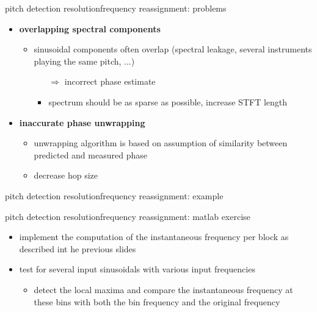         \begin{frame}{pitch detection resolution}{frequency reassignment: problems}
                \begin{itemize}
                    \item   \textbf{overlapping spectral components}
                        \begin{itemize}
                            \item   sinusoidal components often overlap (spectral leakage, several instruments playing the same pitch, ...)
                                \begin{itemize}
                                    \item[$\Rightarrow$] incorrect phase estimate
                                    \bigskip
                                    \item<2-> spectrum should be as sparse as possible, increase STFT length
                                \end{itemize}
                        \end{itemize}
                    \item<3->   \textbf{inaccurate phase unwrapping} 
                        \begin{itemize}
                            \item   unwrapping algorithm is based on assumption of similarity between predicted and measured phase
                            \bigskip
                            \item<2-> decrease hop size
                        \end{itemize}
                \end{itemize}
        \end{frame}
        \begin{frame}{pitch detection resolution}{frequency reassignment: example}
        \end{frame}
        \begin{frame}{pitch detection resolution}{frequency reassignment: matlab exercise}
            
            \begin{itemize}
                \item   implement the computation of the instantaneous frequency per block as described int he previous slides
                \item   test for several input sinusoidals with various input frequencies
                    \begin{itemize}
                        \item   detect the local maxima and compare the instantaneous frequency at these bins with both the bin frequency and the original frequency
                    \end{itemize}
            \end{itemize}
        \end{frame}
